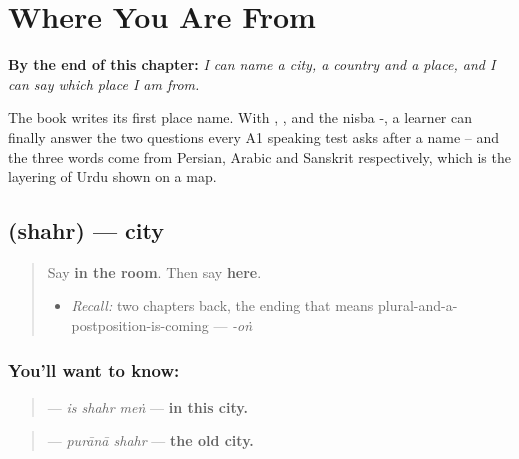 
\chapter{Where You Are From}
\label{ch:ur-where-you-are-from}

\begin{chapteropening}
\textbf{By the end of this chapter:} \emph{I can name a city, a country and a place, and I can say which place I am from.}

The book writes its first place name. With , ,  and the nisba -, a learner can finally answer the two questions every A1 speaking test asks after a name -- and the three words come from Persian, Arabic and Sanskrit respectively, which is the layering of Urdu shown on a map.
\end{chapteropening}

\section[\texorpdfstring{\ur{شہر} (shahr)}{شہر (shahr)}]{ (shahr) — city}

\label{lesson:UR-C27-shahr}



\begin{quote}
Say \textbf{in the room}. Then say \textbf{here}.

\begin{itemize}
\raggedright
  \item \emph{Recall:} two chapters back, the ending that means plural-and-a-postposition-is-coming — \emph{-oṅ}
\end{itemize}
\end{quote}

\subsection*{You'll want to know: }
\begin{quote}
\textbf{  } — \emph{is shahr meṅ} — \textbf{in this city.}
\end{quote}

\begin{quote}
\textbf{ } — \emph{purānā shahr} — \textbf{the old city.}
\end{quote}

